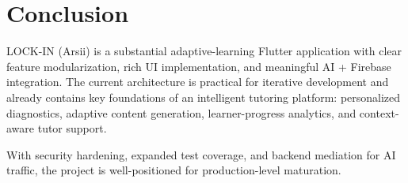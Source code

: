\documentclass[11pt,a4paper]{article}
\begin{document}
\section{Conclusion}
LOCK-IN (Arsii) is a substantial adaptive-learning Flutter application with clear feature modularization, rich UI implementation, and meaningful AI + Firebase integration. The current architecture is practical for iterative development and already contains key foundations of an intelligent tutoring platform: personalized diagnostics, adaptive content generation, learner-progress analytics, and context-aware tutor support.

With security hardening, expanded test coverage, and backend mediation for AI traffic, the project is well-positioned for production-level maturation.
\end{document}
